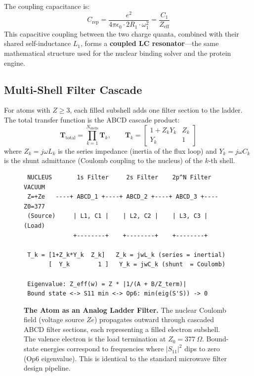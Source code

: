The coupling capacitance is:
\begin{equation}
    C_\text{rep} = \frac{e^2}{4\pi\epsilon_0 \cdot 2R_1 \cdot \omega_1^2} = \frac{C_1}{Z_\text{eff}}
\end{equation}
This capacitive coupling between the two charge quanta, combined with their shared self-inductance $L_1$, forms a \textbf{coupled LC resonator}---the same mathematical structure used for the nuclear binding solver and the protein engine.

\subsection{Multi-Shell Filter Cascade}

For atoms with $Z \geq 3$, each filled subshell adds one filter section to the ladder. The total transfer function is the ABCD cascade product:
\begin{equation}
    \mathbf{T}_\text{total} = \prod_{k=1}^{N_\text{shells}} \mathbf{T}_k, \qquad
    \mathbf{T}_k = \begin{bmatrix} 1 + Z_k Y_k & Z_k \\ Y_k & 1 \end{bmatrix}
\end{equation}
where $Z_k = j\omega L_k$ is the series impedance (inertia of the flux loop) and $Y_k = j\omega C_k$ is the shunt admittance (Coulomb coupling to the nucleus) of the $k$-th shell.

\begin{figure}[h]
\centering
\begin{tcolorbox}[colback=white, colframe=black!50, title={\textbf{Signal-Flow: Atom as Radial Transmission Line}}, width=\textwidth]
\centering
\small
\begin{verbatim}
 NUCLEUS       1s Filter     2s Filter    2p^N Filter     VACUUM
 Z=+Ze   ----+ ABCD_1 +----+ ABCD_2 +----+ ABCD_3 +---- Z0=377
 (Source)     | L1, C1 |    | L2, C2 |    | L3, C3 |     (Load)
              +--------+    +--------+    +--------+

 T_k = [1+Z_k*Y_k  Z_k]   Z_k = jwL_k (series = inertial)
       [  Y_k        1 ]   Y_k = jwC_k (shunt  = Coulomb)

 Eigenvalue: Z_eff(w) = Z * |1/(A + B/Z_term)|
 Bound state <-> S11 min <-> Op6: min(eig(S'S)) -> 0
\end{verbatim}
\end{tcolorbox}
\caption{\textbf{The Atom as an Analog Ladder Filter.}  The nuclear Coulomb field (voltage source $Ze$) propagates outward through cascaded ABCD filter sections, each representing a filled electron subshell. The valence electron is the load termination at $Z_0 = 377~\Omega$. Bound-state energies correspond to frequencies where $|S_{11}|^2$ dips to zero (Op6 eigenvalue). This is identical to the standard microwave filter design pipeline.}
\label{fig:abcd_atom_cascade}
\end{figure}

